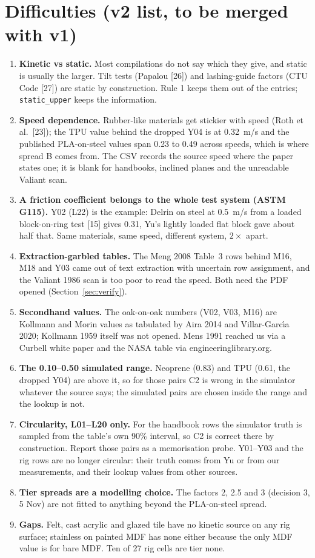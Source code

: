\documentclass[11pt]{article}
\begin{document}
\section{Difficulties (v2 list, to be merged with v1)}\label{sec:difficulties}
\begin{enumerate}
 \item \textbf{Kinetic vs static.} Most compilations do not say which they give, and static is usually the larger. Tilt tests (Papalou [26]) and lashing-guide factors (CTU Code [27]) are static by construction. Rule 1 keeps them out of the entries; \texttt{static\_upper} keeps the information.
 \item \textbf{Speed dependence.} Rubber-like materials get stickier with speed (Roth et al.\ [23]); the TPU value behind the dropped Y04 is at 0.32~m/s and the published PLA-on-steel values span 0.23 to 0.49 across speeds, which is where spread B comes from. The CSV records the source speed where the paper states one; it is blank for handbooks, inclined planes and the unreadable Valiant scan.
 \item \textbf{A friction coefficient belongs to the whole test system (ASTM G115).} Y02 (L22) is the example: Delrin on steel at 0.5~m/s from a loaded block-on-ring test [15] gives 0.31, Yu's lightly loaded flat block gave about half that. Same materials, same speed, different system, $2\times$ apart.
 \item \textbf{Extraction-garbled tables.} The Meng 2008 Table~3 rows behind M16, M18 and Y03 came out of text extraction with uncertain row assignment, and the Valiant 1986 scan is too poor to read the speed. Both need the PDF opened (Section~\ref{sec:verify}).
 \item \textbf{Secondhand values.} The oak-on-oak numbers (V02, V03, M16) are Kollmann and Morin values as tabulated by Aira 2014 and Villar-Garc\'{\i}a 2020; Kollmann 1959 itself was not opened. Mens 1991 reached us via a Curbell white paper and the NASA table via engineeringlibrary.org.
 \item \textbf{The 0.10--0.50 simulated range.} Neoprene (0.83) and TPU (0.61, the dropped Y04) are above it, so for those pairs C2 is wrong in the simulator whatever the source says; the simulated pairs are chosen inside the range and the lookup is not.
 \item \textbf{Circularity, L01--L20 only.} For the handbook rows the simulator truth is sampled from the table's own 90\% interval, so C2 is correct there by construction. Report those pairs as a memorisation probe. Y01--Y03 and the rig rows are no longer circular: their truth comes from Yu or from our measurements, and their lookup values from other sources.
 \item \textbf{Tier spreads are a modelling choice.} The factors 2, 2.5 and 3 (decision 3, 5 Nov) are not fitted to anything beyond the PLA-on-steel spread.
 \item \textbf{Gaps.} Felt, cast acrylic and glazed tile have no kinetic source on any rig surface; stainless on painted MDF has none either because the only MDF value is for bare MDF. Ten of 27 rig cells are tier none.
\end{enumerate}
\end{document}
